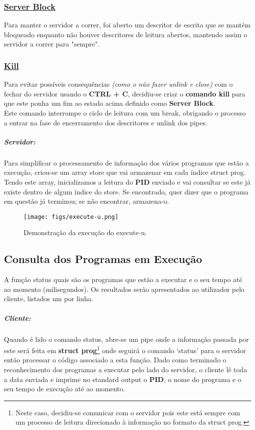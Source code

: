 \documentclass[11.5pt,a4paper]{report}
\begin{document}
\subsubsection{\underline{Server Block}}
Para manter o servidor a correr, foi aberto um descritor de escrita que se mantém bloqueado enquanto não houver descritores de leitura abertos, mantendo assim o servidor a correr para "sempre".
\subsubsection{\underline{Kill}}
Para evitar possíveis consequências \textit{(como o não fazer unlink e close)} com o fechar do servidor usando o \textbf{CTRL + C}, decidiu-se criar o \textbf{comando kill} para que este ponha um fim ao estado acima definido como \textbf{Server Block}.\\
Este comando interrompe o ciclo de leitura com um break, obrigando o processo a entrar na fase de encerramento dos descritores e unlink dos pipes.

\subparagraph{Servidor:}

Para simplificar o processamento de informação dos vários programas que estão a execução, criou-se um array store que vai armazenar em cada índice struct prog. Tendo este array, inicializamos a leitura do \textbf{PID} enviado e vai consultar se este já existe dentro de algum índice do store. Se encontrado, quer dizer que o programa em questão já terminou; se não encontrar, armazena-o.\\ 

\begin{figure}[h]
    \centering
    \texttt{[image: figs/execute-u.png]}
    \caption{Demonstração da execução do execute-u.}
    \label{f}
\end{figure}

\newpage
\subsection{Consulta dos Programas em Execução}
A função status quais são os programas que estão a executar e o seu tempo até ao momento (milisegundos). Os resultados serão apresentados ao utilizador pelo cliente, listados um por linha.

\subparagraph{Cliente:}

Quando é lido o comando status, abre-se um pipe onde a informação passada por este será feita em \textbf{struct prog}\footnote{Neste caso, decidiu-se comunicar com o servidor pois este está sempre com um processo de leitura direcionado à informação no formato da struct prog.} onde seguirá o comando ‘status’ para o servidor então processar o código associado a esta função. Dado como terminado o reconhecimento dos programas a executar pelo lado do servidor, o cliente lê toda a data enviada e imprime no standard output o \textbf{PID}, o nome do programa e o seu tempo de execução até ao momento.
\end{document}
